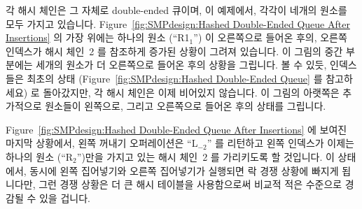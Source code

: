 각 해시 체인은 그 자체로 double-ended 큐이며, 이 예제에서, 각각이 네개의 원소를
모두 가지고 있습니다.
Figure~\ref{fig:SMPdesign:Hashed Double-Ended Queue After Insertions} 의 가장
위에는 하나의 원소 (``R1$_1$'') 이 오른쪽으로 들어온 후의, 오른쪽 인덱스가 해시
체인~2 를 참조하게 증가된 상황이 그려져 있습니다.
이 그림의 중간 부분에는 세개의 원소가 더 오른쪽으로 들어온 후의 상황을
그립니다.
볼 수 있듯, 인덱스들은 최초의 상태
(Figure~\ref{fig:SMPdesign:Hashed Double-Ended Queue} 를 참고하세요) 로
돌아갔지만, 각 해시 체인은 이제 비어있지 않습니다.
이 그림의 아랫쪽은 추가적으로 원소들이 왼쪽으로, 그리고 오른쪽으로 들어온 후의
상태를 그립니다.

Figure~\ref{fig:SMPdesign:Hashed Double-Ended Queue After Insertions} 에 보여진
마지막 상황에서, 왼쪽 꺼내기 오퍼레이션은 ``L$_{-2}$'' 를 리턴하고 왼쪽 인덱스가
이제는 하나의 원소 (``R$_2$'')만을 가지고 있는 해시 체인~2 를 가리키도록 할
것입니다.
이 상태에서, 동시에 왼쪽 집어넣기와 오른쪽 집어넣기가 실행되면 락 경쟁 상황에
빠지게 됩니다만, 그런 경쟁 상황은 더 큰 해시 테이블을 사용함으로써 비교적 적은
수준으로 경감될 수 있을 겁니다.

